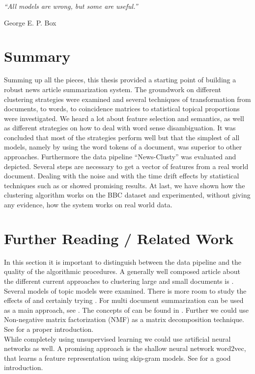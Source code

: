 \epigraph{\emph{
  ``All models are wrong, but some are useful.''
}}{ George E. P. Box }

\section{Summary}
\label{sec:summary}
Summing up all the pieces, this thesis provided a starting point of building a robust  news article summarization system. The groundwork on different clustering strategies were examined and several techniques of transformation from documents, to words, to coincidence matrices to statistical topical proportions were investigated. We heard a lot about feature selection and semantics, as well as different strategies on how to deal with word sense disambiguation. It was concluded that most of the strategies perform well but that the simplest of all models, namely by using the word tokens of a document, was superior to other approaches. Furthermore the data pipeline ``News-Clusty'' was evaluated and depicted. Several steps are necessary to get a vector of features from a real world document. Dealing with the noise and with the time drift effects by statistical techniques such as \lsa{} or \lda{} showed promising results. At last, we have shown how the clustering algorithm works on the BBC dataset and experimented, without giving any evidence, how the system works on real world data.

\section{Further Reading / Related Work}
\label{sec:further_reading}
In this section it is important to distinguish between the data pipeline and the quality of the algorithmic procedures. A generally well composed article about the different current approaches to clustering large and small documents is \cite{NextFrontierClustering2013}.\\

Several models of topic models were examined. There is more room to study the effects of \lda{} and certainly trying \hdp{}. For multi document summarization \lda{} can be used as a main approach, see \cite{MultiDocSumLDA2008}. The concepts of \hdpfull{} can be found in \cite{NonParametricBayes2007, HDP2006}. Further we could use Non-negative matrix factorization (NMF) as a matrix decomposition technique. See \cite{NMF1999} for a proper introduction.\\

While completely using unsupervised learning we could use artificial neural networks as well. A promising approach is the shallow neural network word2vec, that learns a feature representation using skip-gram models. See \cite{Word2Vec2014} for a good introduction.\\

